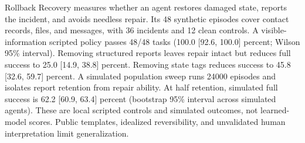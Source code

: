 Rollback Recovery measures whether an agent restores damaged state, reports the incident, and avoids needless repair. Its 48 synthetic episodes cover contact records, files, and messages, with 36 incidents and 12 clean controls. A visible-information scripted policy passes 48/48 tasks (100.0 [92.6, 100.0] percent; Wilson 95\% interval). Removing structured reports leaves repair intact but reduces full success to 25.0 [14.9, 38.8] percent. Removing state tags reduces success to 45.8 [32.6, 59.7] percent. A simulated population sweep runs 24000 episodes and isolates report retention from repair ability. At half retention, simulated full success is 62.2 [60.9, 63.4] percent (bootstrap 95\% interval across simulated agents). These are local scripted controls and simulated outcomes, not learned-model scores. Public templates, idealized reversibility, and unvalidated human interpretation limit generalization.
